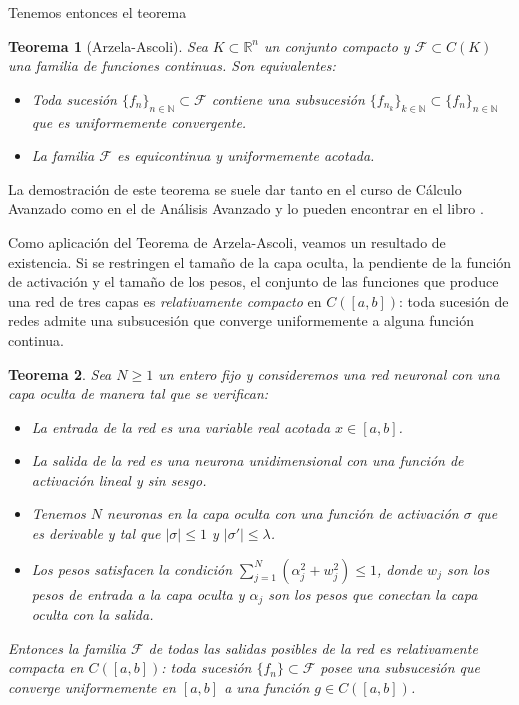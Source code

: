 \documentclass[12pt, a4paper]{amsbook}
\newcommand{\R}{{\mathbb R}}
\newcommand{\N}{{\mathbb N}}
\newcommand{\F}{{\mathcal F}}
\newtheorem{teo}{Teorema}[section]
\theoremstyle{remark}
\theoremstyle{definition}
\numberwithin{section}{chapter}
\numberwithin{subsection}{section}
\numberwithin{equation}{section}
\numberwithin{figure}{chapter}
\begin{document}
Tenemos entonces el teorema
\begin{teo}[Arzela-Ascoli]  
Sea $K\subset \R^n$ un conjunto compacto y $\F\subset C(K)$ una familia de funciones continuas. Son equivalentes:
\begin{itemize}
\item[(a)] Toda sucesión $\{f_n\}_{n\in\N}\subset \F$ contiene una subsucesión $\{f_{n_k}\}_{k\in\N}\subset \{f_n\}_{n\in\N}$ que es uniformemente convergente.
\item[(b)] La familia $\F$ es equicontinua y uniformemente acotada.
\end{itemize}
\end{teo}

La demostración de este teorema se suele dar tanto en el curso de Cálculo Avanzado como en el de Análisis Avanzado y lo pueden encontrar en el libro \cite{Royden}.

Como aplicación del Teorema de Arzela-Ascoli, veamos un resultado de existencia. Si se restringen el tamaño de la capa oculta, la pendiente de la función de activación y el tamaño de los pesos, el conjunto de las funciones que produce una red de tres capas es {\em relativamente compacto} en $C([a,b])$: toda sucesión de redes admite una subsucesión que converge uniformemente a alguna función continua.

\begin{teo}
Sea $N\ge 1$ un entero fijo y consideremos una red neuronal con una capa oculta de manera tal que se verifican:
\begin{itemize}
\item[(a)] La entrada de la red es una variable real acotada $x\in [a, b]$.
\item[(b)] La salida de la red es una neurona unidimensional con una función de activación lineal y sin sesgo.
\item[(c)] Tenemos $N$ neuronas en la capa oculta con una función de activación $\sigma$ que es derivable y tal que $|\sigma|\le 1$ y $|\sigma'|\le \lambda$.
\item[(d)] Los pesos satisfacen la condición $\sum_{j=1}^N (\alpha_j^2 + w_j^2) \le 1$, donde $w_j$ son los pesos de entrada a la capa oculta y $\alpha_j$ son los pesos que conectan la capa oculta con la salida.
\end{itemize}
Entonces la familia $\F$ de todas las salidas posibles de la red es relativamente compacta en $C([a,b])$: toda sucesión $\{f_n\}\subset\F$ posee una subsucesión que converge uniformemente en $[a,b]$ a una función $g\in C([a,b])$.
\end{teo}
\end{document}

